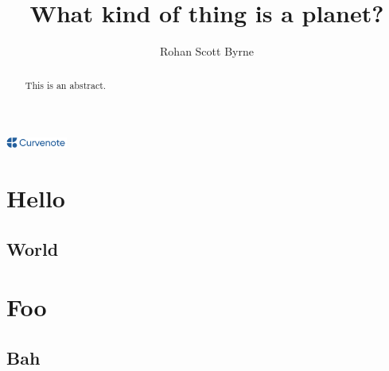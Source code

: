\documentclass{article}
\title{What kind of thing is a planet?}
\author{Rohan Scott Byrne}
\date{\displaydate{articleDate}}
\newcommand{\logo}{
  \href{https://curvenote.com}{\includegraphics[width=2cm]{curvenote.png}}
}
\begin{document}
\maketitle
\begin{abstract}This is an abstract.\end{abstract}\begin{center}\logo\end{center}


\section{Hello}

\subsection{World}

\section{Foo}

\subsection{Bah}
\end{document}
